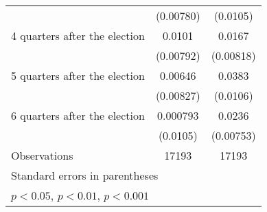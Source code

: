 \begin{table}[htbp]
\begin{tabular}{l*{2}{c}}
                    &   (0.00780)         &    (0.0105)         \\
[1em]
 4 quarters after the election&      0.0101         &      0.0167\sym{*}  \\
                    &   (0.00792)         &   (0.00818)         \\
[1em]
 5 quarters after the election&     0.00646         &      0.0383\sym{***}\\
                    &   (0.00827)         &    (0.0106)         \\
[1em]
 6 quarters after the election&    0.000793         &      0.0236\sym{**} \\
                    &    (0.0105)         &   (0.00753)         \\
\hline
Observations        &       17193         &       17193         \\
\hline\hline
\multicolumn{3}{l}{\footnotesize Standard errors in parentheses}\\
\multicolumn{3}{l}{\footnotesize \sym{*} \(p<0.05\), \sym{**} \(p<0.01\), \sym{***} \(p<0.001\)}\\
\end{tabular}
\end{table}
